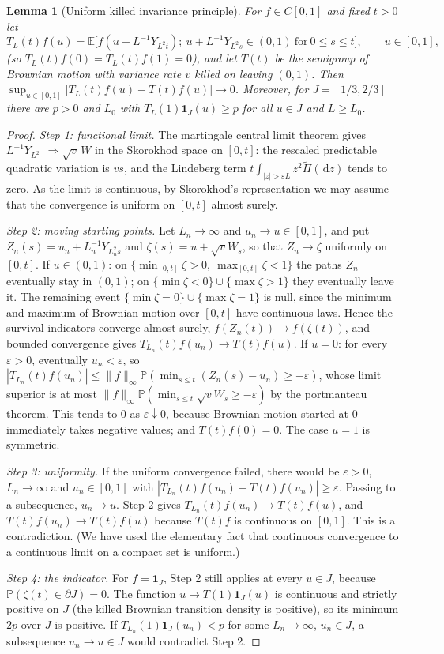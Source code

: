 \documentclass[11pt,a4paper]{article}
\newtheorem{lemma}[theorem]{Lemma}
\theoremstyle{definition}
\theoremstyle{remark}
\newcommand{\E}{\mathbb E}
\newcommand{\Pp}{\mathbb P}
\newcommand{\1}{\mathbf 1}
\newcommand{\dd}{\,\mathrm d}
\begin{document}
\begin{lemma}[Uniform killed invariance principle]\label{lem:semigroup}
For $f\in C[0,1]$ and fixed $t>0$ let
\[
 T_L(t)f(u)=\E\big[f(u+L^{-1}Y_{L^2t});\ u+L^{-1}Y_{L^2s}\in(0,1)\ \text{for}\ 0\le s\le t\big],\qquad u\in[0,1],
\]
(so $T_L(t)f(0)=T_L(t)f(1)=0$), and let $T(t)$ be the semigroup of Brownian motion with variance rate $v$ killed on leaving $(0,1)$. Then $\sup_{u\in[0,1]}|T_L(t)f(u)-T(t)f(u)|\to0$. Moreover, for $J=[1/3,2/3]$ there are $p>0$ and $L_0$ with $T_L(1)\1_J(u)\ge p$ for all $u\in J$ and $L\ge L_0$.
\end{lemma}
\begin{proof}
\emph{Step 1: functional limit.} The martingale central limit theorem gives $L^{-1}Y_{L^2\cdot}\Rightarrow\sqrt v\,W$ in the Skorokhod space on $[0,t]$: the rescaled predictable quadratic variation is $vs$, and the Lindeberg term $t\int_{|z|>\varepsilon L}z^2\widetilde\Pi(\dd z)$ tends to zero. As the limit is continuous, by Skorokhod's representation we may assume that the convergence is uniform on $[0,t]$ almost surely.

\emph{Step 2: moving starting points.} Let $L_n\to\infty$ and $u_n\to u\in[0,1]$, and put $Z_n(s)=u_n+L_n^{-1}Y_{L_n^2s}$ and $\zeta(s)=u+\sqrt vW_s$, so that $Z_n\to\zeta$ uniformly on $[0,t]$. If $u\in(0,1)$: on $\{\min_{[0,t]}\zeta>0,\ \max_{[0,t]}\zeta<1\}$ the paths $Z_n$ eventually stay in $(0,1)$; on $\{\min\zeta<0\}\cup\{\max\zeta>1\}$ they eventually leave it. The remaining event $\{\min\zeta=0\}\cup\{\max\zeta=1\}$ is null, since the minimum and maximum of Brownian motion over $[0,t]$ have continuous laws. Hence the survival indicators converge almost surely, $f(Z_n(t))\to f(\zeta(t))$, and bounded convergence gives $T_{L_n}(t)f(u_n)\to T(t)f(u)$. If $u=0$: for every $\varepsilon>0$, eventually $u_n<\varepsilon$, so $|T_{L_n}(t)f(u_n)|\le\|f\|_\infty\Pp(\min_{s\le t}(Z_n(s)-u_n)\ge-\varepsilon)$, whose limit superior is at most $\|f\|_\infty\Pp(\min_{s\le t}\sqrt vW_s\ge-\varepsilon)$ by the portmanteau theorem. This tends to $0$ as $\varepsilon\downarrow0$, because Brownian motion started at $0$ immediately takes negative values; and $T(t)f(0)=0$. The case $u=1$ is symmetric.

\emph{Step 3: uniformity.} If the uniform convergence failed, there would be $\varepsilon>0$, $L_n\to\infty$ and $u_n\in[0,1]$ with $|T_{L_n}(t)f(u_n)-T(t)f(u_n)|\ge\varepsilon$. Passing to a subsequence, $u_n\to u$. Step 2 gives $T_{L_n}(t)f(u_n)\to T(t)f(u)$, and $T(t)f(u_n)\to T(t)f(u)$ because $T(t)f$ is continuous on $[0,1]$. This is a contradiction. (We have used the elementary fact that continuous convergence to a continuous limit on a compact set is uniform.)

\emph{Step 4: the indicator.} For $f=\1_J$, Step 2 still applies at every $u\in J$, because $\Pp(\zeta(t)\in\partial J)=0$. The function $u\mapsto T(1)\1_J(u)$ is continuous and strictly positive on $J$ (the killed Brownian transition density is positive), so its minimum $2p$ over $J$ is positive. If $T_{L_n}(1)\1_J(u_n)<p$ for some $L_n\to\infty$, $u_n\in J$, a subsequence $u_n\to u\in J$ would contradict Step 2.
\end{proof}
\end{document}
